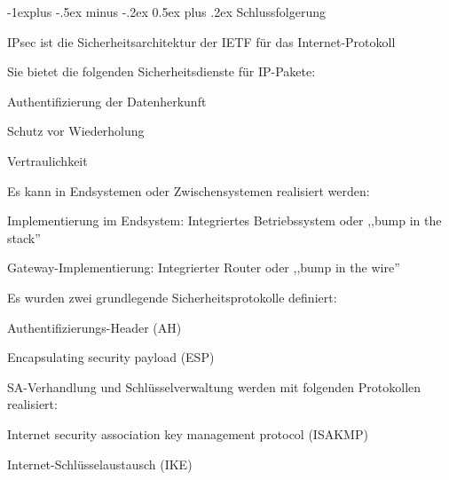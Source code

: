 \documentclass[a4paper]{article}
\makeatletter
\renewcommand{\subsection}{\@startsection{subsection}{2}{0mm}%
 {-1explus -.5ex minus -.2ex}%
 {0.5ex plus .2ex}%
 {\normalfont\normalsize\bfseries}}
\makeatother
\begin{document}
\begin{multicols}{3}
\begin{itemize*}
            \subsection{Schlussfolgerung}
            \begin{itemize*}
                  \item       IPsec ist die Sicherheitsarchitektur der IETF für das
                  Internet-Protokoll
                  \item       Sie bietet die folgenden Sicherheitsdienste für IP-Pakete:
                  \begin{itemize*}
                        \item Authentifizierung der Datenherkunft
                        \item Schutz vor Wiederholung
                        \item Vertraulichkeit
                  \end{itemize*}
                  \item       Es kann in Endsystemen oder Zwischensystemen realisiert werden:
                  \begin{itemize*}
                        \item Implementierung im Endsystem: Integriertes Betriebssystem oder ,,bump in the stack''
                        \item Gateway-Implementierung: Integrierter Router oder ,,bump in the wire''
                  \end{itemize*}
                  \item       Es wurden zwei grundlegende Sicherheitsprotokolle definiert:
                  \begin{itemize*}
                        \item Authentifizierungs-Header (AH)
                        \item Encapsulating security payload (ESP)
                  \end{itemize*}
                  \item       SA-Verhandlung und Schlüsselverwaltung werden mit folgenden
                  Protokollen realisiert:
                  \begin{itemize*}
                        \item Internet security association key management protocol (ISAKMP)
                        \item Internet-Schlüsselaustausch (IKE)
                  \end{itemize*}
            \end{itemize*}


\end{itemize*}
\end{multicols}
\end{document}
